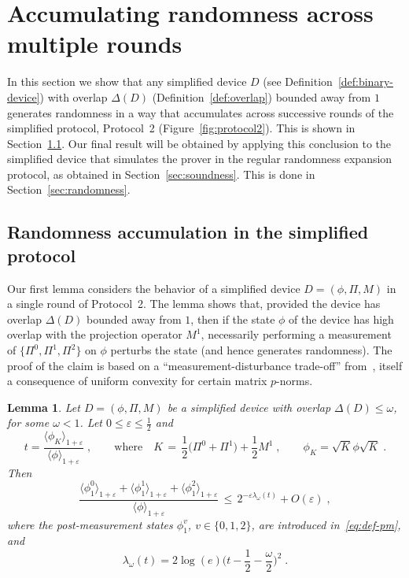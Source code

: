 \documentclass[11pt]{article}
\newtheorem{lemma}[theorem]{Lemma}
\theoremstyle{remark}
\theoremstyle{definition}
\newcommand{\eps}{\varepsilon}
\begin{document}
\section{Accumulating randomness across multiple rounds}
\label{sec:multi-round}

In this section we show that any simplified device $D$ (see Definition~\ref{def:binary-device}) with overlap $\Delta(D)$ (Definition~\ref{def:overlap}) bounded away from $1$ generates randomness in a way that accumulates across  successive rounds of the simplified protocol, Protocol~2 (Figure~\ref{fig:protocol2}). This is shown in Section~\ref{sec:simplified}. Our final result will be obtained by applying this conclusion to the simplified device that simulates the prover in the regular randomness expansion protocol, as obtained in Section~\ref{sec:soundness}. This is done in Section~\ref{sec:randomness}.

\subsection{Randomness accumulation in the simplified protocol}
\label{sec:simplified}

Our first lemma considers the behavior of a simplified device $D=(\phi,\Pi,M)$ in a single round of Protocol~2. The lemma shows that, provided the device has overlap $\Delta(D)$ bounded away from $1$, then if the state $\phi$ of the device has high overlap with the projection operator $M^1$, necessarily performing a measurement of $\{\Pi^0,\Pi^1,\Pi^2\}$ on $\phi$ perturbs the state (and hence generates randomness). The proof of the claim is based on a ``measurement-disturbance trade-off'' from~\cite{miller2016robust}, itself a consequence of uniform convexity for certain matrix $p$-norms. 

\begin{lemma}\label{lem:ms-uncertainty}
Let $D = (\phi,\Pi,M)$ be a simplified device with overlap $\Delta(D)\leq \omega$, for some $\omega<1$. Let  $0\leq \eps \leq \frac{1}{2}$ and 
\begin{equation}\label{eq:game-operator}
t = \frac{\langle \phi_K \rangle_{1+\eps} }{\langle \phi \rangle_{1+\eps}}\;,\qquad\text{where}\quad K \,=\, \frac{1}{2} \big(\Pi^0 + \Pi^1\big) + \frac{1}{2} M^1\;,\qquad \phi_K = \sqrt{K} \phi \sqrt{K}\;.
\end{equation}
Then 
$$\frac{ \langle \phi_1^0 \rangle_{1+\eps} + \langle \phi_1^1 \rangle_{1+\eps} + \langle \phi_1^2 \rangle_{1+\eps}}{\langle \phi \rangle_{1+\eps}} \,\leq\, 2^{-\eps \lambda_\omega(t)} +O(\eps)\;,$$
where the post-measurement states $\phi_1^v$, $v\in\{0,1,2\}$, are introduced in~\eqref{eq:def-pm}, and
\begin{equation}\label{eq:def-lambda}
\lambda_\omega(t) = 2\log(e)\Big(t-\frac{1}{2}-\frac{\omega}{2}\Big)^2\;.
\end{equation} 
\end{lemma}
\end{document}
